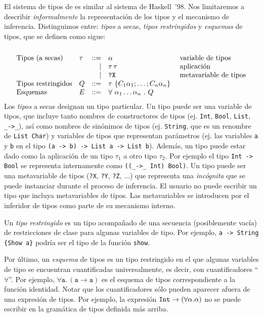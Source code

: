 El sistema de tipos de \nuflo es similar al sistema de Haskell~'98.
Nos limitaremos a describir {\em informalmente} la representación
de los tipos y el mecanismo de inferencia.
Distinguimos entre:
{\em tipos} a secas,
{\em tipos restringidos}
y {\em esquemas} de tipos,
que se definen como sigue:
\[
\begin{array}{llrll}
\\
  \textrm{Tipos (a secas)}
                    & \tau
                    &   ::= & \alpha              & \ \textrm{variable de tipos}    \\
                &   & \vert & \tau\,\tau          & \ \textrm{aplicación}  \\
                &   & \vert & \verb|?X|           & \ \textrm{metavariable de tipos}  \\
  \textrm{Tipos restringidos}
                    & Q
                    &   ::= & \tau\,\,\{ C_1 \alpha_1; \hdots; C_n \alpha_n \} \\
  \textrm{Esquemas} & E & ::= & \forall\ \alpha_1 \hdots \alpha_n\ .\ Q
\\
\end{array}
\]
Los {\em tipos} a secas designan un tipo particular.
Un tipo puede ser una variable de tipos,
que incluye tanto nombres de constructores de tipos (ej. \verb|Int|, \verb|Bool|, \verb|List|, \verb|_->_|),
así como nombres de sinónimos de tipos (ej. \verb|String|, que es un renombre de \verb|List Char|)
y variables de tipos que representan parámetros (ej. las variables \verb|a| y \verb|b| en el
tipo \verb|(a -> b) -> List a -> List b|).
Además, un tipo puede estar dado como la aplicación de un tipo $\tau_1$ a otro tipo $\tau_2$.
Por ejemplo el tipo \verb|Int -> Bool|
se representa internamente como \verb|((_->_ Int) Bool)|.
Un tipo puede ser una metavariable de tipos (\verb|?X|, \verb|?Y|, \verb|?Z|, $\hdots$)
que representa una {\em incógnita} que se puede instanciar durante el proceso
de inferencia. El usuario no puede escribir un tipo que incluya metavariables
de tipos. Las metavariables se introducen por el inferidor de tipos como parte de su
mecanismo interno.

Un {\em tipo restringido} es un tipo acompañado de una secuencia (posiblemente vacía)
de restricciones de clase para algunas variables de tipo.
Por ejemplo, \verb|a -> String {Show a}| podría ser el tipo de la función \verb|show|.

Por último, un {\em esquema} de tipos es un tipo restringido
en el que algunas variables de tipo se encuentran cuantificadas universalmente,
es decir, con cuantificadores ``$\forall$''.
Por ejemplo, $\forall \texttt{a}.\,(\texttt{a} \rightarrow \texttt{a})$
es el esquema de tipos correspondiente a la función identidad.
Notar que los cuantificadores sólo pueden aparecer afuera de una expresión
de tipos.
Por ejemplo, la expresión $\verb|Int| \rightarrow (\forall \alpha .\alpha)$
no se puede escribir en la gramática de tipos definida más arriba.


